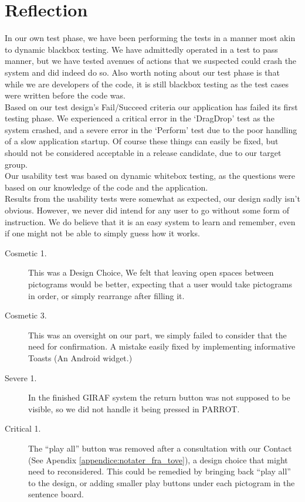 \section{Reflection}
In our own test phase, we have been performing the tests in a manner most akin to dynamic blackbox testing.
We have admittedly operated in a test to pass manner, but we have tested avenues of actions that we suspected could crash the system and did indeed do so.
Also worth noting about our test phase is that while we are developers of the code, it is still blackbox testing as the test cases were written before the code was.\\
Based on our test design's Fail/Succeed criteria our application has failed its first testing phase.
We experienced a critical error in the `DragDrop' test as the system crashed, and a severe error in the `Perform' test due to the poor handling of a slow application startup.
Of course these things can easily be fixed, but should not be considered acceptable in a release candidate, due to our target group.\\

Our usability test was based on dynamic whitebox testing, as the questions were based on our knowledge of the code and the application.\\
Results from the usability tests were somewhat as expected, our design sadly isn't obvious.
However, we never did intend for any user to go without some form of instruction.
We do believe that it is an easy system to learn and remember, even if one might not be able to simply guess how it works.\\

\begin{description}
	\item[Cosmetic 1.] This was a Design Choice, We felt that leaving open spaces between pictograms would be better, expecting that a user would take pictograms in order, or simply rearrange after filling it.
	\item[Cosmetic 3.] This was an oversight on our part, we simply failed to consider that the need for confirmation. A mistake easily fixed by implementing informative Toasts (An Android widget.)
	\item[Severe 1.] In the finished GIRAF system the return button was not supposed to be visible, so we did not handle it being pressed in PARROT.
	\item[Critical 1.] The ``play all'' button was removed after a consultation with our Contact (See Apendix \ref{appendice:notater_fra_tove}), a design choice that might need to reconsidered. This could be remedied by bringing back ``play all'' to the design, or adding smaller play buttons under each pictogram in the sentence board.  
\end{description}


